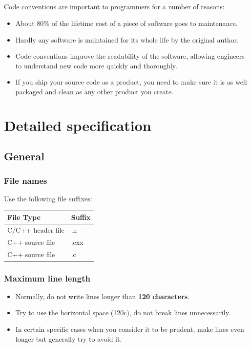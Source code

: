 \documentclass[a4paper,twoside,15pt]{book}
\begin{document}
    \paragraph{}
    Code conventions are important to programmers for a number of reasons:
    \begin{itemize}
        \item About 80\% of the lifetime cost of a piece of software goes to maintenance.
        \item Hardly any software is maintained for its whole life by the original author.
        \item Code conventions improve the readability of the software, allowing engineers to understand new code more quickly and thoroughly.
        \item If you ship your source code as a product, you need to make sure it is as well packaged and clean as any other product you create.
    \end{itemize}

\chapter{Detailed specification}
    \section{General}
        \subsection{File names}
            Use the following file suffixes:\\
            \begin{table}[h!]
                \begin{tabular}{l|l}
                    \textbf{File Type}  & \textbf{Suffix} \\\hline
                    C/C++ header file   & .h              \\
                    C++ source file     & .cxx            \\
                    C++ source file     & .c
                \end{tabular}
            \end{table}

            \subsection{Maximum line length}
                \begin{itemize}
                    \item Normally, do not write lines longer than \textbf{120 characters}.
                    \item Try to use the horizontal space (120c), do not break lines unnecessarily.
                    \item In certain specific cases when you consider it to be prudent, make lines even longer but generally try to avoid it.
                \end{itemize}
\end{document}
